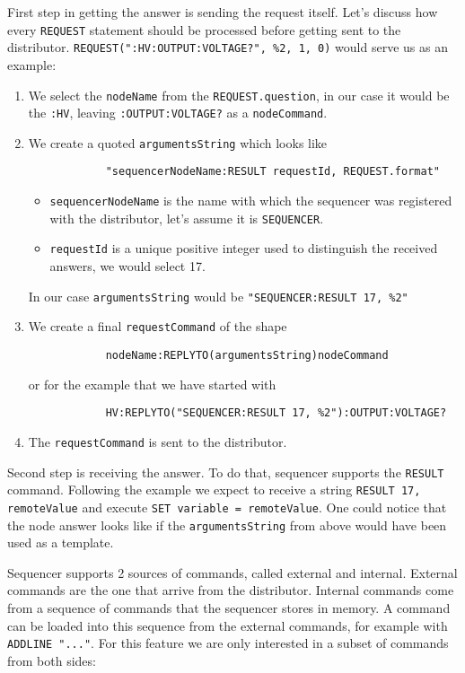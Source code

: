 First step in getting the answer is sending the request itself. Let's discuss how every \texttt{REQUEST} statement should be processed before getting sent to the distributor. \texttt{REQUEST(":HV:OUTPUT:VOLTAGE?", \%2, 1, 0)} would serve us as an example:

\begin{enumerate}
	\item We select the \texttt{nodeName} from the \texttt{REQUEST.question}, in our case it would be the \texttt{:HV}, leaving \texttt{:OUTPUT:VOLTAGE?} as a \texttt{nodeCommand}.
	\item{
		We create a quoted \texttt{argumentsString} which looks like 
		\begin{verbatim}
			"sequencerNodeName:RESULT requestId, REQUEST.format"
		\end{verbatim}
		\begin{itemize}
			\item \texttt{sequencerNodeName} is the name with which the sequencer was registered with the distributor, let's assume it is \texttt{SEQUENCER}.
			\item \texttt{requestId} is a unique positive integer used to distinguish the received answers, we would select 17.
		\end{itemize}
		In our case \texttt{argumentsString} would be \texttt{"SEQUENCER:RESULT 17, \%2"}
	}
	\item{
		We create a final \texttt{requestCommand} of the shape
		\begin{verbatim}
			nodeName:REPLYTO(argumentsString)nodeCommand
		\end{verbatim}
		or for the example that we have started with
		\begin{verbatim}
			HV:REPLYTO("SEQUENCER:RESULT 17, %2"):OUTPUT:VOLTAGE?
		\end{verbatim}
	}
	\item The \texttt{requestCommand} is sent to the distributor.
\end{enumerate}

Second step is receiving the answer. To do that, sequencer supports the \texttt{RESULT} command. Following the example we expect to receive a string \texttt{RESULT 17, remoteValue} and execute \texttt{SET variable = remoteValue}. One could notice that the node answer looks like if the \texttt{argumentsString} from above would have been used as a template.

Sequencer supports 2 sources of commands, called external and internal. External commands are the one that arrive from the distributor. Internal commands come from a sequence of commands that the sequencer stores in memory. A command can be loaded into this sequence from the external commands, for example with \texttt{ADDLINE "..."}. For this feature we are only interested in a subset of commands from both sides:

